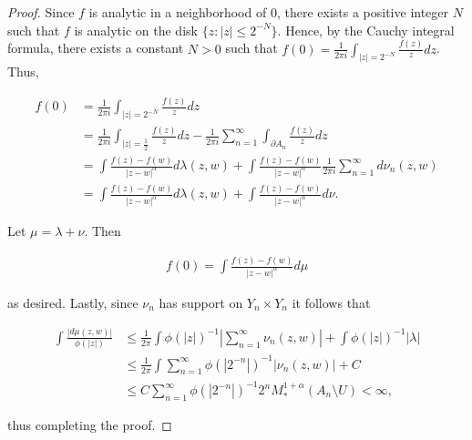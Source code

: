 \documentclass[10pt,a4paper]{amsart}
\begin{document}
\begin{proof}
 Since $f$ is analytic in a neighborhood of $0$, there exists a positive integer $N$ such that $f$ is analytic on the disk $\{z:|z| \leq 2^{-N}\}$. Hence, by the Cauchy integral formula, there exists a constant $N>0$ such that $\displaystyle f(0) = \frac{1}{2\pi i}\int_{|z|=2^{-N}} \frac{f(z)}{z}dz$. Thus,

\begin{align*}
f(0) &= \frac{1}{2\pi i}\int_{|z|=2^{-N}} \frac{f(z)}{z}dz\\
 &= \frac{1}{2\pi i}  \int_{|z|=\frac{1}{2}} \frac{f(z)}{z} dz - \frac{1}{2\pi i} \sum_{n=1}^{\infty} \int_{\partial A_n} \frac{f(z)}{z} dz\\
    &= \int \frac{f(z)-f(w)}{|z-w|^{\alpha}} d\lambda(z,w) + \int \frac{f(z)-f(w)}{|z-w|^{\alpha}} \frac{1}{2\pi i} \sum_{n=1}^{\infty} d\nu_n(z,w)\\
     &= \int \frac{f(z)-f(w)}{|z-w|^{\alpha}} d\lambda(z,w) + \int \frac{f(z)-f(w)}{|z-w|^{\alpha}} d\nu.
\end{align*}

\noindent Let $\mu = \lambda + \nu$. Then 

\begin{align*}
    f(0) = \int \frac{f(z) - f(w)}{|z-w|^{\alpha}} d \mu
\end{align*}

\noindent as desired. Lastly, since $\nu_n$ has support on $Y_n \times Y_n$ it follows that

\begin{align*}
    \int \frac{|d\mu(z,w)|}{\phi(|z|)} &\leq \frac{1}{2\pi} \int \phi(|z|)^{-1} \left| \sum_{n=1}^{\infty} \nu_n(z,w) \right| + \int \phi(|z|)^{-1} |\lambda|\\
    &\leq\frac{1}{2\pi} \int \sum_{n=1}^{\infty} \phi(|2^{-n}|)^{-1} |\nu_n(z,w)| + C\\
    &\leq C \sum_{n=1}^{\infty}  \phi(|2^{-n}|)^{-1} 2^n M_*^{1+\alpha}(A_n \setminus U) < \infty,
\end{align*}

\noindent thus completing the proof.
    
\end{proof}
\end{document}
